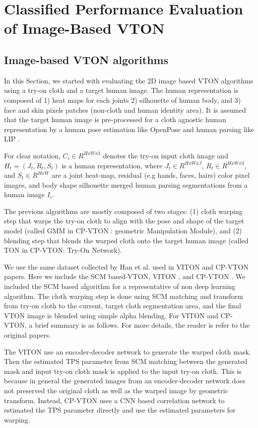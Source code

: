 
\section{Classified Performance Evaluation of Image-Based VTON}

\subsection{Image-based VTON algorithms}

In this Section, we started with evaluating the 2D image based VTON algorithms using a try-on cloth and a target human image. The human representation is composed of 1) heat maps for each joints 2) silhouette of human body, and 3) face and skin pixels patches (non-cloth and human identity area). It is assumed that the target human image is pre-processed for a cloth agnostic human representation by a human pose estimation like OpenPose\cite{Cao2018OpenPoseRM} and human parsing like LIP \cite{Liang2018LookIP}. 

For clear notation, $C_i \in R^{HxWx3} $ denotes the try-on input cloth image 
and $ H_t = (J_t, R_t, S_t)$ is a human representation, 
where $ J_t \in R^{HxWxJ}$, $R_t \in R^{HxWx3}$, and $ S_t \in R^{HxW}$ are a joint heat-map, residual (e.g hands, faces, hairs) color pixel images, and body shape silhouette merged human parsing segmentations from a human image $I_i$.    


The previous algorithms are mostly composed of two stages: (1) cloth warping step that warps the try-on cloth to align with the pose and shape of the target model (called GMM in CP-VTON \cite{Wang2018TowardCI}: geometric Manipulation Module), and (2) blending step that blends the warped cloth onto the target human image (called TON in CP-VTON: Try-On Network). 

We use the same dataset collected by Han et al. used in VITON\cite{Han2017VITONAI} and CP-VTON\cite{Wang2018TowardCI} papers. Here we include the SCM based-VTON, VITON \cite{Han2017VITONAI}, and  CP-VTON \cite{Wang2018TowardCI}. We included the SCM based algorithm  for a representative of non deep learning algorithm. The cloth warping step is done using SCM matching and transform from try-on cloth to the current, target cloth segmentation area, and the final VTON image is blended using simple alpha blending. For VITON and CP-VTON, a brief summary is as follows. For more details, the reader is refer to the original papers.

The VITON use an encoder-decoder network to generate the warped cloth mask. Then the estimated TPS parameter from SCM matching between the generated mask and input try-on cloth mask is applied to the input try-on cloth. This is because in general the generated images from an encoder-decoder network does not preserved the original cloth as well as the warped image by geometric transform. Instead, CP-VTON uses a CNN based correlation network to estimated the TPS parameter directly and use the estimated parameters for warping.   

